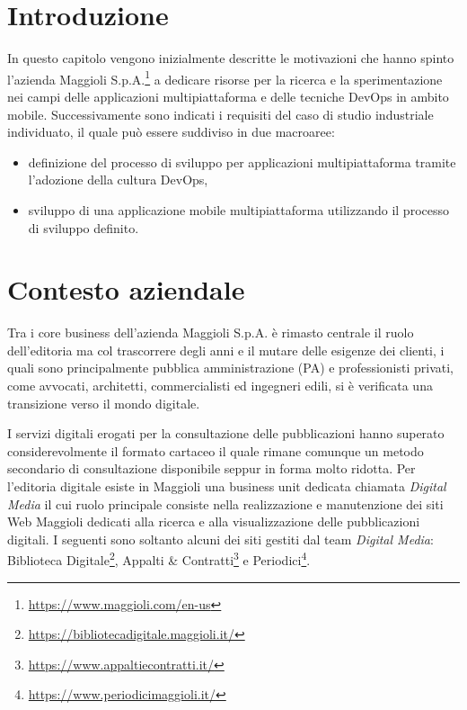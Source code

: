 
\section{Introduzione}

In questo capitolo vengono inizialmente descritte le motivazioni che hanno spinto l'azienda Maggioli S.p.A.\footnote{\href{https://www.maggioli.com/en-us}{https://www.maggioli.com/en-us}} a dedicare risorse per la ricerca e la sperimentazione nei campi delle applicazioni multipiattaforma e delle tecniche DevOps in ambito mobile. Successivamente sono indicati i requisiti del caso di studio industriale individuato, il quale può essere suddiviso in due macroaree:
\begin{itemize}
    \item definizione del processo di sviluppo per applicazioni multipiattaforma tramite l'adozione della cultura DevOps,
    \item sviluppo di una applicazione mobile multipiattaforma utilizzando il processo di sviluppo definito.
\end{itemize}

\section{Contesto aziendale}
Tra i core business dell'azienda Maggioli S.p.A. è rimasto centrale il ruolo dell'editoria ma col trascorrere degli anni e il mutare delle esigenze dei clienti, i quali sono principalmente pubblica amministrazione (PA) e professionisti privati, come avvocati, architetti, commercialisti ed ingegneri edili, si è verificata una transizione verso il mondo digitale.

I servizi digitali erogati per la consultazione delle pubblicazioni hanno superato considerevolmente il formato cartaceo il quale rimane comunque un metodo secondario di consultazione disponibile seppur in forma molto ridotta. Per l'editoria digitale esiste in Maggioli una business unit dedicata chiamata \textit{Digital Media} il cui ruolo principale consiste nella realizzazione e manutenzione dei siti Web Maggioli dedicati alla ricerca e alla visualizzazione delle pubblicazioni digitali. I seguenti sono soltanto alcuni dei siti gestiti dal team \textit{Digital Media}: Biblioteca Digitale\footnote{\href{https://bibliotecadigitale.maggioli.it/}{https://bibliotecadigitale.maggioli.it/}}, Appalti \& Contratti\footnote{\href{https://www.appaltiecontratti.it/}{https://www.appaltiecontratti.it/}} e Periodici\footnote{\href{https://www.periodicimaggioli.it/}{https://www.periodicimaggioli.it/}}. 

